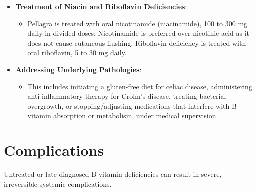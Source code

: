 \begin{itemize}
\begin{itemize}
    \end{itemize}
    \item \textbf{Treatment of Niacin and Riboflavin Deficiencies}:
    \begin{itemize}
        \item Pellagra is treated with oral nicotinamide (niacinamide), 100 to 300 mg daily in divided doses. Nicotinamide is preferred over nicotinic acid as it does not cause cutaneous flushing. Riboflavin deficiency is treated with oral riboflavin, 5 to 30 mg daily.
    \end{itemize}
    \item \textbf{Addressing Underlying Pathologies}:
    \begin{itemize}
        \item This includes initiating a gluten-free diet for celiac disease, administering anti-inflammatory therapy for Crohn's disease, treating bacterial overgrowth, or stopping/adjusting medications that interfere with B vitamin absorption or metabolism, under medical supervision.
    \end{itemize}
\end{itemize}

\section*{Complications}
Untreated or late-diagnosed B vitamin deficiencies can result in severe, irreversible systemic complications.


